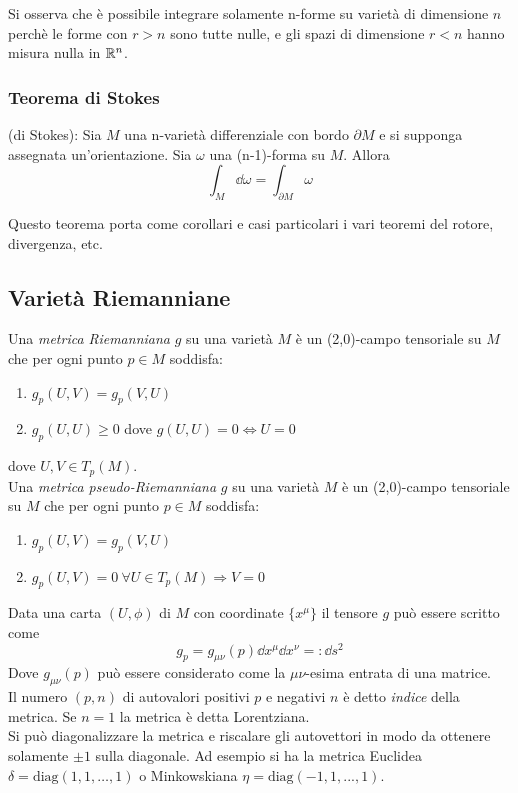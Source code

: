 Si osserva che è possibile integrare solamente n-forme su varietà di dimensione $n$
perchè le forme con $r>n$ sono tutte nulle, e gli spazi di dimensione $r<n$ hanno
misura nulla in $\mathbb{R}^n$.

\subsubsection{Teorema di Stokes}
\begin{theorem}{(di Stokes)}:
   Sia $M$ una n-varietà differenziale con bordo $\partial M$ e si supponga assegnata
   un'orientazione. Sia $\omega$ una (n-1)-forma su $M$. Allora
   \begin{equation}\label{eq:stokestheorem}
      \int_M \dd \omega = \int_{\partial M} \omega
   \end{equation}
\end{theorem}
Questo teorema porta come corollari e casi particolari i vari teoremi del rotore,
divergenza, etc.
\subsection{Varietà Riemanniane}
\begin{definition}
   Una \emph{metrica Riemanniana} $g$ su una varietà $M$ è un (2,0)-campo tensoriale
   su $M$ che per ogni punto $p \in M$ soddisfa:
   \begin{enumerate}
      \item $ g_p(U,V) = g_p(V,U) $
      \item $ g_p(U,U) \geq 0 $ dove $ g(U,U) = 0 \iff U = 0$
   \end{enumerate}
   dove $U,V \in T_p(M)$.\\

   Una \emph{metrica pseudo-Riemanniana} $g$ su una varietà $M$ è un
   (2,0)-campo tensoriale su $M$ che per ogni punto $p \in M$ soddisfa:
   \begin{enumerate}
      \item $ g_p(U,V) = g_p(V,U) $
      \item $ g_p(U,V) = 0 \: \forall U \in T_p(M) \Rightarrow V = 0$
   \end{enumerate}
\end{definition}

Data una carta $(U,\phi)$ di $M$ con coordinate $\{x^\mu\}$ il tensore $g$ può
essere scritto come
$$ g_p = g_{\mu\nu}(p) \dd x^\mu \dd x^\nu =: \dd s^2$$
Dove $g_{\mu\nu}(p)$ può essere considerato come la $\mu\nu$-esima entrata di una matrice.\\
Il numero $(p,n)$ di autovalori positivi $p$ e negativi $n$ è detto \emph{indice} della
metrica. Se $n=1$ la metrica è detta Lorentziana.\\
Si può diagonalizzare la metrica e riscalare gli autovettori in modo da ottenere
solamente $\pm 1$ sulla diagonale. Ad esempio si ha la metrica Euclidea
$\delta = \mathrm{diag}(1,1,\dots,1)$ o Minkowskiana $\eta = \mathrm{diag}(-1,1,...,1)$.\\

